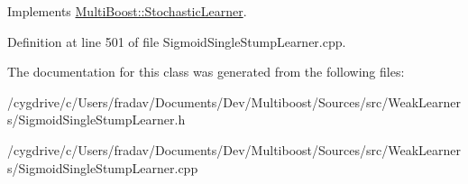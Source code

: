 Implements \hyperlink{classMultiBoost_1_1StochasticLearner_a0827c95202f6f3f5180292f72f2f3e0f}{MultiBoost::StochasticLearner}.



Definition at line 501 of file SigmoidSingleStumpLearner.cpp.



The documentation for this class was generated from the following files:\begin{DoxyCompactItemize}
\item 
/cygdrive/c/Users/fradav/Documents/Dev/Multiboost/Sources/src/WeakLearners/SigmoidSingleStumpLearner.h\item 
/cygdrive/c/Users/fradav/Documents/Dev/Multiboost/Sources/src/WeakLearners/SigmoidSingleStumpLearner.cpp\end{DoxyCompactItemize}
